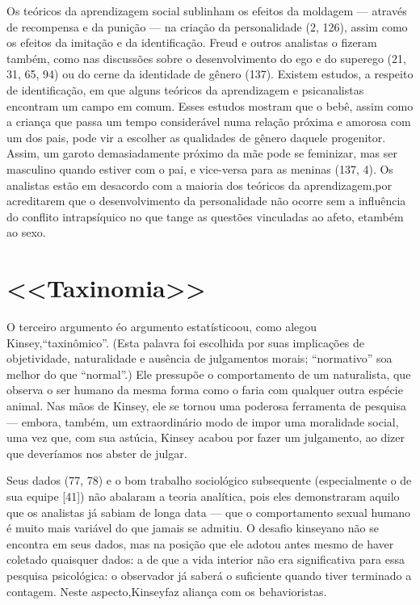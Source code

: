  Os teóricos da aprendizagem social sublinham os efeitos da moldagem ---
através de recompensa e da punição --- na criação da personalidade (2,
126), assim como os efeitos da imitação e da identificação.\idxident{} Freud e
outros analistas o fizeram também, como nas discussões sobre o
desenvolvimento do ego e do superego (21, 31, 65, 94) ou do cerne da
identidade de gênero\idxidencer{} (137). Existem estudos, a respeito de
identificação, em que alguns teóricos da aprendizagem e psicanalistas
encontram um campo em comum. Esses estudos mostram que o bebê, assim
como a criança que passa um tempo considerável numa relação próxima e
amorosa com um dos pais, pode vir a escolher as qualidades de gênero
daquele progenitor. Assim, um garoto demasiadamente próximo da mãe pode
se feminizar, mas ser masculino quando estiver com o pai, e vice-versa
para as meninas (137, 4). Os analistas estão em desacordo com a
maioria dos teóricos da aprendizagem,\idxaberrteor[|)] por acreditarem que o
desenvolvimento da personalidade não ocorre sem a influência do
conflito intrapsíquico no que tange as questões vinculadas ao afeto, e\idxsocia[|)]
também ao sexo.




\section{<<Taxinomia>>}

O terceiro argumento é\idxestat[|(] o argumento estatístico\idxaberrestat[|(] ou, como alegou
Kinsey,\idxkins[|(] ``taxinômico''. (Esta palavra foi escolhida por suas implicações de objetividade, naturalidade e ausência de julgamentos morais; ``normativo'' soa melhor do que ``normal''.) Ele pressupõe o comportamento de um naturalista, que observa o ser humano da mesma forma como o faria
com qualquer outra espécie animal. Nas mãos de Kinsey, ele se tornou
uma poderosa ferramenta de pesquisa --- embora, também, um
extraordinário modo de impor uma moralidade social, uma vez que, com
sua astúcia, Kinsey acabou por fazer um julgamento, ao dizer que
deveríamos nos abster de julgar.

 Seus dados (77, 78) e o bom trabalho sociológico subsequente
(especialmente o de sua equipe [41]) não abalaram a teoria analítica,
pois eles demonstraram aquilo que os analistas já sabiam de longa data
--- que o comportamento sexual humano é muito mais variável do que jamais
se admitiu. O desafio kinseyano não se encontra em seus dados, mas na
posição que ele adotou antes mesmo de haver coletado quaisquer dados: a
de que a vida interior não era significativa para essa pesquisa
psicológica: o observador já saberá o suficiente quando tiver terminado
a contagem. Neste aspecto,\idxestat[|)] Kinsey\idxkins[|)] faz aliança com os behavioristas.





